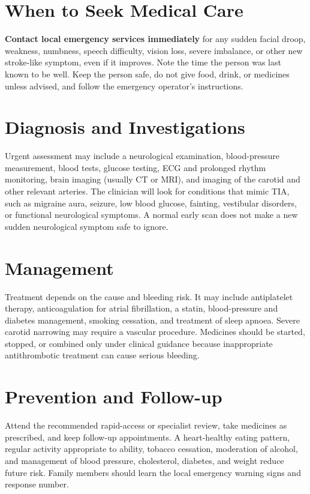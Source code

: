 \section*{When to Seek Medical Care}
\textbf{Contact local emergency services immediately} for any sudden facial droop, weakness, numbness, speech difficulty, vision loss, severe imbalance, or other new stroke-like symptom, even if it improves. Note the time the person was last known to be well. Keep the person safe, do not give food, drink, or medicines unless advised, and follow the emergency operator's instructions.

\section*{Diagnosis and Investigations}
Urgent assessment may include a neurological examination, blood-pressure measurement, blood tests, glucose testing, ECG and prolonged rhythm monitoring, brain imaging (usually CT or MRI), and imaging of the carotid and other relevant arteries. The clinician will look for conditions that mimic TIA, such as migraine aura, seizure, low blood glucose, fainting, vestibular disorders, or functional neurological symptoms. A normal early scan does not make a new sudden neurological symptom safe to ignore.

\section*{Management}
Treatment depends on the cause and bleeding risk. It may include antiplatelet therapy, anticoagulation for atrial fibrillation, a statin, blood-pressure and diabetes management, smoking cessation, and treatment of sleep apnoea. Severe carotid narrowing may require a vascular procedure. Medicines should be started, stopped, or combined only under clinical guidance because inappropriate antithrombotic treatment can cause serious bleeding.

\section*{Prevention and Follow-up}
Attend the recommended rapid-access or specialist review, take medicines as prescribed, and keep follow-up appointments. A heart-healthy eating pattern, regular activity appropriate to ability, tobacco cessation, moderation of alcohol, and management of blood pressure, cholesterol, diabetes, and weight reduce future risk. Family members should learn the local emergency warning signs and response number.

